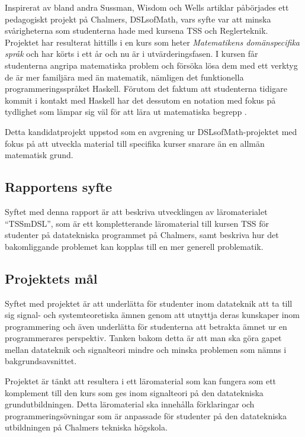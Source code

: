 \documentclass[]{article}
\begin{document}
Inspirerat av bland andra Sussman, Wisdom och Wells artiklar påbörjades ett
pedagogiskt projekt på Chalmers, \gls{DSLsofMath}, vars syfte var att minska
svårigheterna som studenterna hade med kursena TSS och Reglerteknik.
Projektet har resulterat hittills i en kurs som heter
\textit{Matematikens domänspecifika språk} och har körts i ett år och nu
är i utvärderingsfasen. I kursen får studenterna angripa
matematiska problem och försöka lösa dem med ett verktyg de är
mer familjära med än matematik, nämligen det funktionella
programmerings\-språket Haskell. Förutom det faktum att studenterna tidigare
kommit i kontakt med Haskell har det dessutom en notation med fokus på
tydlighet som lämpar sig väl för att lära ut matematiska begrepp
\cite{TFPIE15_DSLsofMath_IonescuJansson}.

Detta kandidatprojekt uppstod som en avgrening ur DSLsofMath-projektet med fokus
på att utveckla material till specifika kurser snarare än en allmän matematisk grund.

\subsection{Rapportens syfte}


Syftet med denna rapport är att beskriva utvecklingen av läromaterialet
``\gls{TSSmDSL}'', som är ett kompletterande läromaterial till kursen TSS
för studenter på datatekniska programmet på Chalmers, samt beskriva hur det
bakomliggande problemet kan kopplas till en mer generell problematik.

\subsection{Projektets mål}
Syftet med projektet är att underlätta för studenter inom datateknik att
ta till sig signal- och systemteoretiska ämnen genom att utnyttja deras
kunskaper inom programmering och även underlätta för studenterna att betrakta
ämnet ur en programmerares perspektiv. Tanken bakom detta är att man ska göra
gapet mellan datateknik och signalteori mindre och minska problemen som nämns
i bakgrundsavsnittet.

Projektet är tänkt att resultera i ett läromaterial som kan fungera som ett
komplement till den kurs som ges inom signalteori på den datatekniska
grund\-utbildningen. Detta läromaterial ska innehålla förklaringar och
programmeringsövningar som är anpassade för studenter på den datatekniska
utbildningen på Chalmers tekniska högskola.
\end{document}
